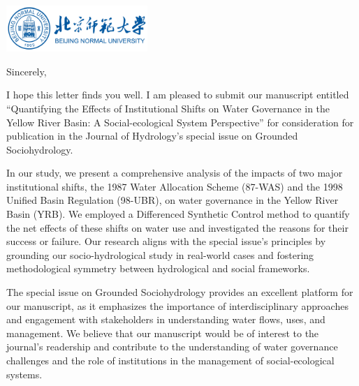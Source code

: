 \documentclass[11pt,a4paper,roman]{moderncv}
\begin{document}
\begin{minipage}[t]{\textwidth}
\includegraphics[width=0.40\textwidth]{bnu}
\end{minipage}


\opening{\vspace*{-2em}}
\closing{Sincerely,}{\vspace*{-2em}}
\makelettertitle
\justify

I hope this letter finds you well. I am pleased to submit our manuscript entitled ``Quantifying the Effects of Institutional Shifts on Water Governance in the Yellow River Basin: A Social-ecological System Perspective'' for consideration for publication in the Journal of Hydrology's special issue on Grounded Sociohydrology.

In our study, we present a comprehensive analysis of the impacts of two major institutional shifts, the 1987 Water Allocation Scheme (87-WAS) and the 1998 Unified Basin Regulation (98-UBR), on water governance in the Yellow River Basin (YRB). We employed a Differenced Synthetic Control method to quantify the net effects of these shifts on water use and investigated the reasons for their success or failure. Our research aligns with the special issue's principles by grounding our socio-hydrological study in real-world cases and fostering methodological symmetry between hydrological and social frameworks.

The special issue on Grounded Sociohydrology provides an excellent platform for our manuscript, as it emphasizes the importance of interdisciplinary approaches and engagement with stakeholders in understanding water flows, uses, and management. We believe that our manuscript would be of interest to the journal's readership and contribute to the understanding of water governance challenges and the role of institutions in the management of social-ecological systems.


\end{document}
